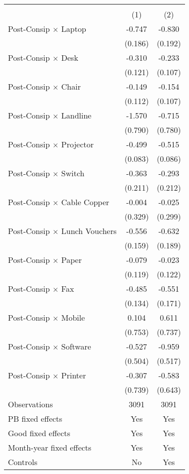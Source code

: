 \begin{tabular}{l*{2}{c}}
\hline\hline
                    &\multicolumn{2}{c}{ }    \\
                    &\multicolumn{1}{c}{(1)}&\multicolumn{1}{c}{(2)}\\
\hline
Post-Consip $\times$ Laptop&      -0.747&      -0.830\\
                    &     (0.186)&     (0.192)\\
[1em]
Post-Consip $\times$ Desk&      -0.310&      -0.233\\
                    &     (0.121)&     (0.107)\\
[1em]
Post-Consip $\times$ Chair&      -0.149&      -0.154\\
                    &     (0.112)&     (0.107)\\
[1em]
Post-Consip $\times$ Landline&      -1.570&      -0.715\\
                    &     (0.790)&     (0.780)\\
[1em]
Post-Consip $\times$ Projector&      -0.499&      -0.515\\
                    &     (0.083)&     (0.086)\\
[1em]
Post-Consip $\times$ Switch&      -0.363&      -0.293\\
                    &     (0.211)&     (0.212)\\
[1em]
Post-Consip $\times$ Cable Copper&      -0.004&      -0.025\\
                    &     (0.329)&     (0.299)\\
[1em]
Post-Consip $\times$ Lunch Vouchers&      -0.556&      -0.632\\
                    &     (0.159)&     (0.189)\\
[1em]
Post-Consip $\times$ Paper&      -0.079&      -0.023\\
                    &     (0.119)&     (0.122)\\
[1em]
Post-Consip $\times$ Fax&      -0.485&      -0.551\\
                    &     (0.134)&     (0.171)\\
[1em]
Post-Consip $\times$ Mobile&       0.104&       0.611\\
                    &     (0.753)&     (0.737)\\
[1em]
Post-Consip $\times$ Software&      -0.527&      -0.959\\
                    &     (0.504)&     (0.517)\\
[1em]
Post-Consip $\times$ Printer&      -0.307&      -0.583\\
                    &     (0.739)&     (0.643)\\
\hline
Observations        &        3091&        3091\\
PB fixed effects    &         Yes&         Yes\\
Good fixed effects  &         Yes&         Yes\\
Month-year fixed effects&         Yes&         Yes\\
Controls            &          No&         Yes\\
\hline\hline
\end{tabular}
